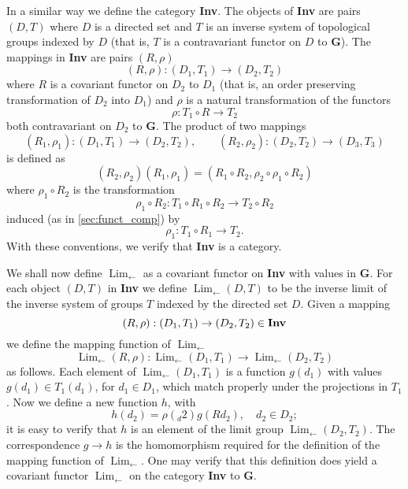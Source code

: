 \documentclass[11pt,a4paper]{report}
\DeclareMathOperator{\Lim}{Lim}
\begin{document}
In a similar way we define the category \textbf{Inv}. The objects of \textbf{Inv} are pairs $(D,T)$ where $D$ is a directed set and $T$
is an inverse system of topological groups indexed by $D$ (that is, $T$ is a contravariant functor on $D$ to $\mathbf{G}$). The mappings
in \textbf{Inv} are pairs $(R,\rho)$
\begin{equation*}
	(R,\rho):(D_1,T_1)\rightarrow (D_2,T_2)
\end{equation*}
where $R$ is a covariant functor on $D_2$ to $D_1$ (that is, an order preserving transformation of $D_2$ into $D_1$) and $\rho$ is a 
natural transformation of the functors
\begin{equation*}
	\rho:T_1\circ R\rightarrow T_2
\end{equation*}
both contravariant on $D_2$ to $\mathbf{G}$. The product of two mappings
\begin{equation*}
	(R_1,\rho_1):(D_1,T_1)\rightarrow (D_2,T_2),\qquad (R_2,\rho_2):(D_2,T_2)\rightarrow (D_3,T_3)
\end{equation*}
is defined as
\begin{equation*}
	(R_2,\rho_2)(R_1,\rho_1)= (R_1\circ R_2, \rho_2\circ\rho_1\circ R_2)
\end{equation*}
where $\rho_1\circ R_2$ is the transformation
\begin{equation*}
	\rho_1\circ R_2:T_1\circ R_1\circ R_2\rightarrow T_2\circ R_2
\end{equation*}
induced (as in \cref{sec:funct_comp}) by
\begin{equation*}
	\rho_1:T_1\circ R_1\rightarrow T_2.
\end{equation*}
With these conventions, we verify that \textbf{Inv} is a category.

We shall now define $\Lim_{\leftarrow}$ as a covariant functor on \textbf{Inv} with values in $\mathbf{G}$. For each object
$(D,T)$ in  \textbf{Inv} we define $\Lim_{\leftarrow}(D,T)$ to be the inverse limit of the inverse system of groups $T$
indexed by the directed set $D$. Given a mapping
\begin{equation}\label{eq:inv_map}
	(R,\rho):(D_1,T_1)\rightarrow (D_2,T_2)\in\text{\textbf{Inv}}
\end{equation}
we define the mapping function of $\Lim_{\leftarrow}$
\begin{equation}\label{eq:inv_map2}
	\Lim_{\leftarrow}(R,\rho):\Lim_{\leftarrow}(D_1,T_1)\rightarrow \Lim_{\leftarrow}(D_2,T_2)
\end{equation}
as follows. Each element of $\Lim_{\leftarrow}(D_1,T_1)$ is a function $g(d_1)$ with values $g(d_1)\in T_1(d_1)$, for
$d_1\in D_1$, which match properly under the projections in $T_1$. Now we define a new function $h$, with
\begin{equation*}
	h(d_2)= \rho(_d2)g(R d_2),\quad d_2\in D_2;
\end{equation*}
it is easy to verify that $h$ is an element of the limit group $\Lim_{\leftarrow}(D_2,T_2)$. The correspondence $g\rightarrow h$
is the homomorphism  required for the definition of the mapping function of $\Lim_{\leftarrow}$. One may
verify that this definition does yield a covariant functor $\Lim_{\leftarrow}$ on the category \textbf{Inv} to $\mathbf{G}$.
\end{document}
